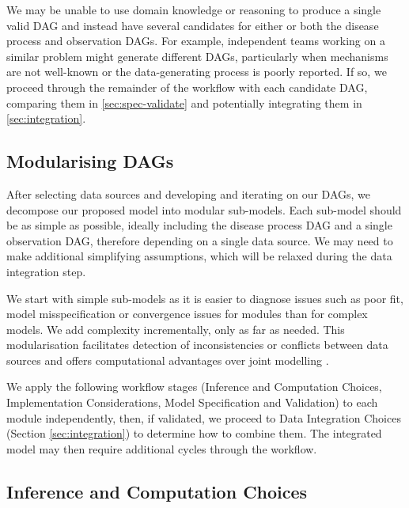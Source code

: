 \documentclass{article}
\begin{document}
We may be unable to use domain knowledge or reasoning to produce a single valid DAG and instead have several candidates for either or both the disease process and observation DAGs. For example, independent teams working on a similar problem might generate different DAGs, particularly when mechanisms are not well-known or the data-generating process is poorly reported. If so, we proceed through the remainder of the workflow with each candidate DAG, comparing them in \ref{sec:spec-validate} and potentially integrating them in \ref{sec:integration}.

\subsection{Modularising DAGs} \label{sec:modularise}

After selecting data sources and developing and iterating on our DAGs, we decompose our proposed model into modular sub-models.
Each sub-model should be as simple as possible, ideally including the disease process DAG and a single observation DAG, therefore depending on a single data source.
We may need to make additional simplifying assumptions, which will be relaxed during the data integration step.

We start with simple sub-models as it is easier to diagnose issues such as poor fit, model misspecification or convergence issues for modules than for complex models.
We add complexity incrementally, only as far as needed.
This modularisation facilitates detection of inconsistencies or conflicts between data sources \citep{presanis2013conflict,manderson2023combining} and offers computational advantages over joint modelling \citep{deangelis2018analysing,goudie2019joining,gelman2020bayesian,nicholson2022interoperability}.

We apply the following workflow stages (Inference and Computation Choices, Implementation Considerations, Model Specification and Validation) to each module independently, then, if validated, we proceed to Data Integration Choices (Section \ref{sec:integration}) to determine how to combine them.
The integrated model may then require additional cycles through the workflow.

\subsection{Inference and Computation Choices}\label{sec:fitting}
\end{document}
